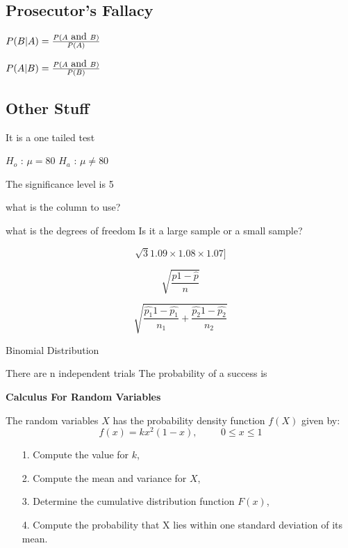 \documentclass[]{report}
\begin{document}
		








\subsection{ Prosecutor's Fallacy}



$	P(B|A) = { P(A \mbox{ and } B) \over P(A) } $

$	P(A|B) = { P( A \mbox{ and }B) \over P(B) } $











\subsection{Other Stuff}							

It is a one tailed test

$H_o$  : $\mu = 80 $
$H_a$  : $\mu \neq 80$ 

The significance level is 5%

what is the column to use?

what is the degrees of freedom 
Is it a large sample or a small sample?



\[	\sqrt{3}{1.09 \times 1.08 \times 1.07}]\]


\[	\sqrt{ \frac{\hat{p} 1- \hat{p}}{n} }\]


\[	\sqrt{ \frac{\hat{p_1} 1- \hat{p_1}}{n_1} + \frac{\hat{p_2} 1- \hat{p_2}}{n_2}}\]



Binomial Distribution

There are n independent trials
The probability of a success is



\noindent \textbf{Calculus For Random Variables}


The random variables $X$ has the probability density function $f(X)$ given by:
\[ f(x) = kx^2(1-x), \phantom{space} 0 \leq x \leq 1 \]

\begin{itemize}
	\item[1.] Compute the value for $k$,
	\item[2.] Compute the mean and variance for $X$,
	\item[3.] Determine the cumulative distribution function $F(x)$,
	\item[4.] Compute the probability that X lies within one standard deviation of its mean.
\end{itemize}
\end{document}
